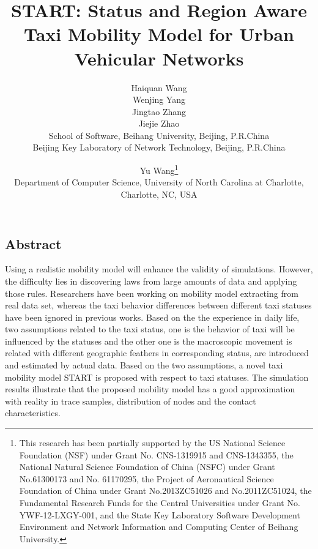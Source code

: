 \documentclass[twocolumn,10pt]{IEEEtran}
\begin{document}
\date{}

\title{\Large \bf START: Status and Region Aware Taxi Mobility Model for Urban Vehicular Networks}

\author{
{\rm Haiquan Wang}\\
{\rm Wenjing Yang}\\
{\rm Jingtao Zhang}\\
{\rm Jiejie Zhao}\\
School of Software, Beihang University, Beijing, P.R.China\\
Beijing Key Laboratory of Network Technology, Beijing, P.R.China\\
\and
{\rm Yu Wang\thanks{
 This research has been partially supported by the US National Science Foundation (NSF) under Grant No. CNS-1319915 and CNS-1343355, the National Natural Science Foundation of China (NSFC) under Grant No.61300173 and No. 61170295, the Project of Aeronautical Science Foundation of China under Grant No.2013ZC51026 and No.2011ZC51024, the Fundamental Research Funds for the Central Universities under Grant No. YWF-12-LXGY-001, and the State Key Laboratory Software Development Environment and Network Information and Computing Center of Beihang University.}}\\
Department of Computer Science, University of North Carolina at Charlotte, Charlotte, NC, USA\\
} %

\maketitle


\subsection*{Abstract}
Using a realistic mobility model will enhance the validity of simulations. However, the difficulty lies in discovering laws from large amounts of data and applying those rules. Researchers have been working on mobility model extracting from real data set, whereas the taxi behavior differences between different taxi statuses have been ignored in previous works.
Based on the the experience in daily life, two assumptions related to the taxi status, one is the behavior of taxi will be influenced by the statuses and the other one is the macroscopic movement is related with different geographic feathers in corresponding status, are introduced and estimated by actual data. Based on the two assumptions, a novel taxi mobility model START is proposed with respect to taxi statuses. The simulation results illustrate that the proposed mobility model has a good approximation with reality in trace samples, distribution of nodes and the contact characteristics.
\end{document}
